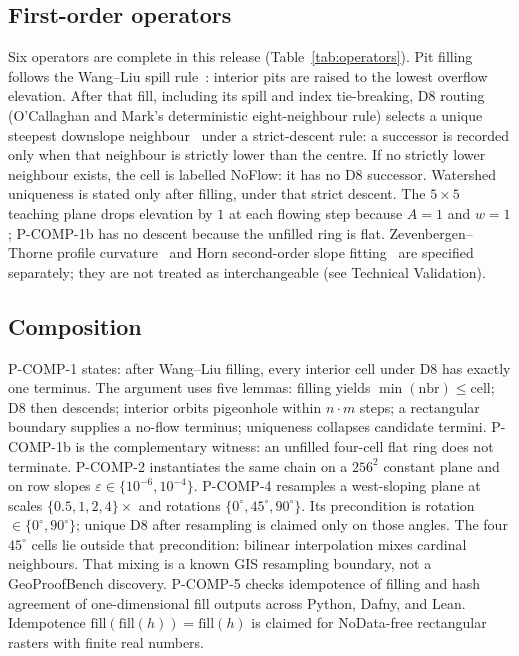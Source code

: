 \documentclass[11pt,a4paper]{article}
\begin{document}
\subsection{First-order operators}

Six operators are complete in this release (Table~\ref*{tab:operators}).
Pit filling follows the Wang--Liu spill rule~\cite{wang2006}: interior
pits are raised to the lowest overflow elevation. After that
fill, including its spill and index tie-breaking, D8 routing (O'Callaghan
and Mark's deterministic eight-neighbour rule) selects a
unique steepest downslope neighbour~\cite{ocallaghan1984} under a
strict-descent rule: a successor is recorded only when that neighbour is
strictly lower than the centre. If no strictly lower neighbour exists,
the cell is labelled NoFlow: it has no D8 successor. Watershed uniqueness is stated only after filling,
under that strict descent. The $5\times5$ teaching plane drops elevation
by $1$ at each flowing step because $A=1$ and $w=1$; P-COMP-1b has no
descent because the unfilled ring is flat.
Zevenbergen--Thorne profile curvature~\cite{zevenbergen1987} and Horn
second-order slope fitting~\cite{horn1981} are specified separately; they are
not treated as interchangeable (see Technical Validation).

\subsection{Composition}

P-COMP-1 states: after Wang--Liu filling, every interior cell under D8
has exactly one terminus. The argument uses five lemmas: filling yields
$\min(\mathrm{nbr})\le\mathrm{cell}$; D8 then descends; interior orbits
pigeonhole within $n\cdot m$ steps; a rectangular boundary supplies a
no-flow terminus; uniqueness collapses candidate termini. P-COMP-1b is
the complementary witness: an unfilled four-cell flat ring does not
terminate. P-COMP-2 instantiates the same chain on a $256^{2}$ constant
plane and on row slopes $\varepsilon\in\{10^{-6},10^{-4}\}$. P-COMP-4
resamples a west-sloping plane at scales $\{0.5,1,2,4\}\times$ and
rotations $\{0^{\circ},45^{\circ},90^{\circ}\}$. Its precondition is
rotation $\in\{0^{\circ},90^{\circ}\}$; unique D8 after resampling is
claimed only on those angles. The four $45^{\circ}$ cells lie outside that
precondition: bilinear interpolation mixes cardinal neighbours. That
mixing is a known GIS resampling boundary, not a GeoProofBench discovery.
P-COMP-5 checks
idempotence of filling and hash agreement of one-dimensional fill
outputs across Python, Dafny, and Lean. Idempotence
$\mathrm{fill}(\mathrm{fill}(h))=\mathrm{fill}(h)$ is claimed for
NoData-free rectangular rasters with finite real numbers.
\end{document}
